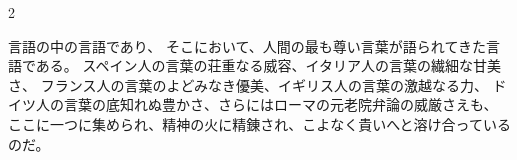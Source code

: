 \begin{paracol}{2}
\begin{japanese}
\begin{quotedquotation}\noindent 言語の中の言語であり、
そこにおいて、人間の最も尊い言葉が語られてきた言語である。
スペイン人の言葉の荘重なる威容、イタリア人の言葉の繊細な甘美さ、
フランス人の言葉のよどみなき優美、イギリス人の言葉の激越なる力、
ドイツ人の言葉の底知れぬ豊かさ、さらにはローマの元老院弁論の威厳さえも、
ここに一つに集められ、精神の火に精錬され、こよなく貴いへと溶け合っているのだ。\end{quotedquotation}
\end{japanese}
\switchcolumn*

\end{paracol}
